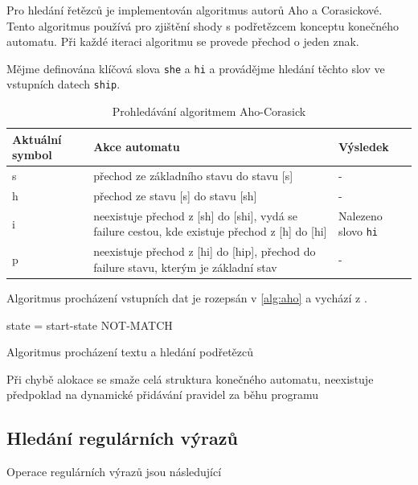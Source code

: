 Pro hledání řetězců je implementován algoritmus autorů Aho a Corasickové. Tento algoritmus používá pro zjištění shody s podřetězcem konceptu konečného automatu. Při každé iteraci algoritmu se provede přechod o jeden znak.


Mějme definována klíčová slova \texttt{she} a \texttt{hi} a provádějme hledání těchto slov ve vstupních
datech \texttt{ship}.

\begin{table}[!htbp]
	\center
	\label{tab:pm-paper}
    \begin{tabular}{|l|p{8cm}|l|}
    \hline
    Aktuální symbol & Akce automatu & Výsledek \\ \hline
    s & přechod ze základního stavu do stavu [s] & - \\ \hline
    h & přechod ze stavu [s] do stavu [sh] & - \\ \hline
    i & neexistuje přechod z [sh] do [shi],
    vydá se failure cestou,
    kde existuje přechod z [h] do [hi] & Nalezeno slovo \texttt{hi} \\ \hline
    p & neexistuje přechod z [hi] do [hip],
    přechod do failure stavu,
    kterým je základní stav & - \\ \hline
    \end{tabular}
	\caption{Prohledávání algoritmem Aho-Corasick}
\end{table}


Algoritmus procházení vstupních dat je rozepsán v \ref{alg:aho} a vychází z \cite{aho}.

\begin{algorithm}
	state = start-state\;
	{
	}
	\Return NOT-MATCH\;
	\caption{Algoritmus procházení textu a hledání podřetězců}
\end{algorithm}\label{alg:aho}

Při chybě alokace se smaže celá struktura konečného automatu, neexistuje předpoklad na dynamické přidávání pravidel za běhu programu

\subsection{Hledání regulárních výrazů} %

Operace regulárních výrazů jsou následující

